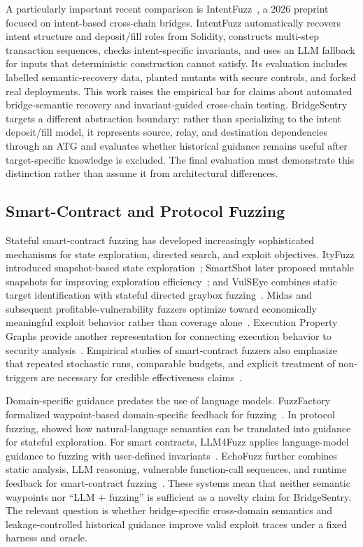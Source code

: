 A particularly important recent comparison is IntentFuzz~\citep{augusto2026intentfuzz}, a 2026 preprint focused on intent-based cross-chain bridges. IntentFuzz automatically recovers intent structure and deposit/fill roles from Solidity, constructs multi-step transaction sequences, checks intent-specific invariants, and uses an LLM fallback for inputs that deterministic construction cannot satisfy. Its evaluation includes labelled semantic-recovery data, planted mutants with secure controls, and forked real deployments. This work raises the empirical bar for claims about automated bridge-semantic recovery and invariant-guided cross-chain testing. BridgeSentry targets a different abstraction boundary: rather than specializing to the intent deposit/fill model, it represents source, relay, and destination dependencies through an ATG and evaluates whether historical guidance remains useful after target-specific knowledge is excluded. The final evaluation must demonstrate this distinction rather than assume it from architectural differences.

\subsection{Smart-Contract and Protocol Fuzzing}

Stateful smart-contract fuzzing has developed increasingly sophisticated mechanisms for state exploration, directed search, and exploit objectives. ItyFuzz introduced snapshot-based state exploration~\citep{shou2023ityfuzz}; SmartShot later proposed mutable snapshots for improving exploration efficiency~\citep{liang2025smartshot}; and VulSEye combines static target identification with stateful directed graybox fuzzing~\citep{liang2025vulseye}. Midas and subsequent profitable-vulnerability fuzzers optimize toward economically meaningful exploit behavior rather than coverage alone~\citep{ye2024midas,kong2025fuzzing}. Execution Property Graphs provide another representation for connecting execution behavior to security analysis~\citep{qin2025epg}. Empirical studies of smart-contract fuzzers also emphasize that repeated stochastic runs, comparable budgets, and explicit treatment of non-triggers are necessary for credible effectiveness claims~\citep{wu2024fuzzers,klees2018evaluating}.

Domain-specific guidance predates the use of language models. FuzzFactory formalized waypoint-based domain-specific feedback for fuzzing~\citep{padhye2019fuzzfactory}. In protocol fuzzing, \citet{meng2024llmguided} showed how natural-language semantics can be translated into guidance for stateful exploration. For smart contracts, LLM4Fuzz applies language-model guidance to fuzzing with user-defined invariants~\citep{shou2024llm4fuzz}. EchoFuzz further combines static analysis, LLM reasoning, vulnerable function-call sequences, and runtime feedback for smart-contract fuzzing~\citep{li2026echofuzz}. These systems mean that neither semantic waypoints nor ``LLM + fuzzing'' is sufficient as a novelty claim for BridgeSentry. The relevant question is whether bridge-specific cross-domain semantics and leakage-controlled historical guidance improve valid exploit traces under a fixed harness and oracle.

